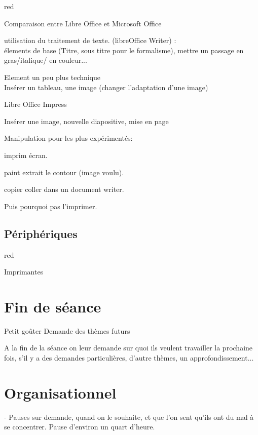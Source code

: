 \begin{items}{red}{\Circle}
\item Comparaison entre Libre Office et Microsoft Office
\item utilisation du traitement de texte. (libreOffice Writer) :\\
élements de base (Titre, sous titre pour le formalisme), mettre un passage en gras/italique/ en couleur...
\item Element un peu plus technique\\
Insérer un tableau, une image (changer l'adaptation d'une image)

\item Libre Office Impress
\item Insérer une image, nouvelle diapositive, mise en page
\end{items}

Manipulation pour les plus expérimentés:

imprim écran.

paint extrait le contour (image voulu).

copier coller dans un document writer.

Puis pourquoi pas l'imprimer.


\subsection{Périphériques}

\begin{items}{red}{\Circle}
\item Imprimantes
\end{items}
\section{Fin de séance}

Petit goûter 
Demande des thèmes futurs



A la fin de la séance on leur demande sur quoi ils veulent travailler la prochaine fois, s'il y a des demandes particulières, d'autre thèmes, un approfondissement... 


\section{Organisationnel}

- Pauses sur demande, quand on le souhaite, et que l'on sent qu'ils ont du mal à se concentrer. Pause d'environ un quart d'heure.


